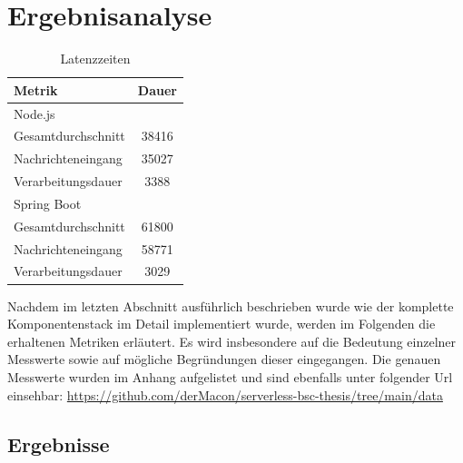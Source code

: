 \chapter{Ergebnisanalyse}



\begin{table}
  \centering
  \label{tab:latency}
  \hspace{1cm}
  \begin{tabular}{@{}lc@{}}
    \toprule
    Metrik & Dauer \\
    \midrule
    Node.js \\
    \hspace{3mm}Gesamtdurchschnitt & 38416 \\
    \hspace{3mm}Nachrichteneingang & 35027 \\
    \hspace{3mm}Verarbeitungsdauer & 3388 \\
    \midrule
    Spring Boot \\
    \hspace{3mm}Gesamtdurchschnitt & 61800 \\
    \hspace{3mm}Nachrichteneingang & 58771 \\
    \hspace{3mm}Verarbeitungsdauer & 3029 \\
    \bottomrule
  \end{tabular}
  \caption[Latenzzeit - Vergleich]{Latenzzeiten}
\end{table} 


Nachdem im letzten Abschnitt ausführlich beschrieben wurde wie der komplette Komponentenstack im Detail implementiert wurde, werden im Folgenden die erhaltenen Metriken erläutert. Es wird insbesondere auf die Bedeutung einzelner Messwerte sowie auf mögliche Begründungen dieser eingegangen. Die genauen Messwerte wurden im Anhang aufgelistet und sind ebenfalls unter folgender Url einsehbar: \url{https://github.com/derMacon/serverless-bsc-thesis/tree/main/data} 


\section{Ergebnisse}

